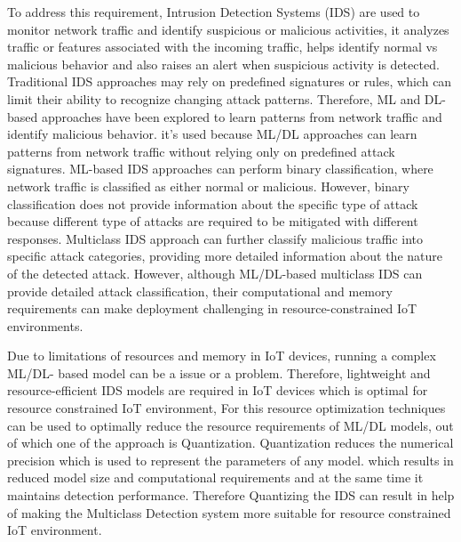 \documentclass[]{interact}
\theoremstyle{plain}%
\theoremstyle{definition}
\theoremstyle{remark}
\begin{document}
To address this requirement, Intrusion Detection Systems (IDS) are used to monitor network traffic and identify suspicious or malicious activities, it analyzes traffic or features associated with the incoming traffic\cite{abdulganiyu2023systematic}, helps identify normal vs malicious behavior and also raises an alert when suspicious activity is detected. Traditional IDS approaches may rely on predefined signatures or rules, which can limit their ability to recognize changing attack patterns.\cite{khraisat2019survey} Therefore, ML and DL-based approaches have been explored to learn patterns from network traffic and identify malicious behavior. it's used because ML/DL approaches can learn patterns from network traffic without relying only on predefined attack signatures.\cite{rakine2025comprehensive} ML-based IDS approaches can perform binary classification, where network traffic is classified as either normal or malicious. However, binary classification does not provide information about the specific type of attack\cite{palshikar2022distinguishes} because different type of attacks are required to be mitigated with different responses. Multiclass IDS approach can further classify malicious traffic into specific attack categories, providing more detailed information about the nature of the detected attack. However, although ML/DL-based multiclass IDS can provide detailed attack classification, their computational and memory requirements can make deployment challenging in resource-constrained IoT environments. \cite{mallidi2025advancements}

Due to limitations of resources and memory in IoT devices, running a complex ML/DL- based model can be a issue or a problem. Therefore, lightweight and resource-efficient IDS models are required in IoT devices which is optimal for resource constrained IoT environment,\cite{arshad2020intrusion} For this resource optimization techniques can be used to optimally reduce the resource requirements of ML/DL models, out of which one of the approach is Quantization. \cite{gholami2022survey}Quantization reduces the numerical precision which is used to represent the parameters of any model. which results in reduced model size and computational requirements and at the same time it maintains detection performance. Therefore Quantizing the IDS can result in help of making the Multiclass Detection system more suitable for resource constrained IoT environment. \cite{misrak2025lightweight}
\end{document}
